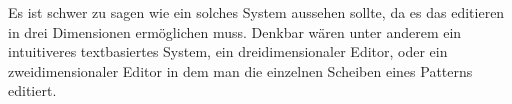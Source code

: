 Es ist schwer zu sagen wie ein solches System aussehen sollte, da es das editieren in drei Dimensionen ermöglichen muss. Denkbar wären unter anderem ein intuitiveres textbasiertes System, ein dreidimensionaler Editor, oder ein zweidimensionaler Editor in dem man die einzelnen Scheiben eines Patterns editiert. 










